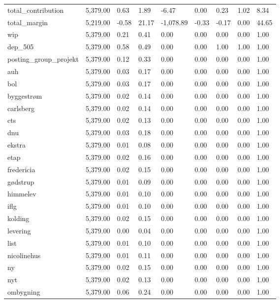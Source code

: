 \begin{tabular}{lllllllll}
total_contribution & 5,379.00 & 0.63 & 1.89 & -6.47 & 0.00 & 0.23 & 1.02 & 8.34 \\
total_margin & 5,219.00 & -0.58 & 21.17 & -1,078.89 & -0.33 & -0.17 & 0.00 & 44.65 \\
wip & 5,379.00 & 0.21 & 0.41 & 0.00 & 0.00 & 0.00 & 0.00 & 1.00 \\
dep_505 & 5,379.00 & 0.58 & 0.49 & 0.00 & 0.00 & 1.00 & 1.00 & 1.00 \\
posting_group_projekt & 5,379.00 & 0.12 & 0.33 & 0.00 & 0.00 & 0.00 & 0.00 & 1.00 \\
auh & 5,379.00 & 0.03 & 0.17 & 0.00 & 0.00 & 0.00 & 0.00 & 1.00 \\
bol & 5,379.00 & 0.03 & 0.17 & 0.00 & 0.00 & 0.00 & 0.00 & 1.00 \\
byggestrøm & 5,379.00 & 0.02 & 0.14 & 0.00 & 0.00 & 0.00 & 0.00 & 1.00 \\
carlsberg & 5,379.00 & 0.02 & 0.14 & 0.00 & 0.00 & 0.00 & 0.00 & 1.00 \\
cts & 5,379.00 & 0.02 & 0.13 & 0.00 & 0.00 & 0.00 & 0.00 & 1.00 \\
dnu & 5,379.00 & 0.03 & 0.18 & 0.00 & 0.00 & 0.00 & 0.00 & 1.00 \\
ekstra & 5,379.00 & 0.01 & 0.08 & 0.00 & 0.00 & 0.00 & 0.00 & 1.00 \\
etap & 5,379.00 & 0.02 & 0.16 & 0.00 & 0.00 & 0.00 & 0.00 & 1.00 \\
fredericia & 5,379.00 & 0.02 & 0.15 & 0.00 & 0.00 & 0.00 & 0.00 & 1.00 \\
gødstrup & 5,379.00 & 0.01 & 0.09 & 0.00 & 0.00 & 0.00 & 0.00 & 1.00 \\
himmelev & 5,379.00 & 0.01 & 0.10 & 0.00 & 0.00 & 0.00 & 0.00 & 1.00 \\
iflg & 5,379.00 & 0.01 & 0.10 & 0.00 & 0.00 & 0.00 & 0.00 & 1.00 \\
kolding & 5,379.00 & 0.02 & 0.15 & 0.00 & 0.00 & 0.00 & 0.00 & 1.00 \\
levering & 5,379.00 & 0.00 & 0.04 & 0.00 & 0.00 & 0.00 & 0.00 & 1.00 \\
list & 5,379.00 & 0.01 & 0.10 & 0.00 & 0.00 & 0.00 & 0.00 & 1.00 \\
nicolinehus & 5,379.00 & 0.01 & 0.11 & 0.00 & 0.00 & 0.00 & 0.00 & 1.00 \\
ny & 5,379.00 & 0.02 & 0.15 & 0.00 & 0.00 & 0.00 & 0.00 & 1.00 \\
nyt & 5,379.00 & 0.02 & 0.13 & 0.00 & 0.00 & 0.00 & 0.00 & 1.00 \\
ombygning & 5,379.00 & 0.06 & 0.24 & 0.00 & 0.00 & 0.00 & 0.00 & 1.00 \\

\end{tabular}
